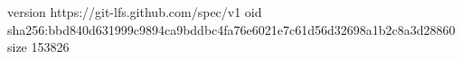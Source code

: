 version https://git-lfs.github.com/spec/v1
oid sha256:bbd840d631999c9894ca9bddbc4fa76e6021e7c61d56d32698a1b2c8a3d28860
size 153826
